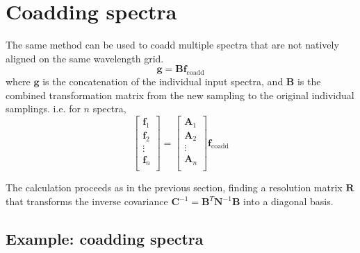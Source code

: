 \documentclass[12pt]{article}
\newcommand{\Ci}{\mathbf{C}^{-1}}
\newcommand{\R}{\mathbf{R}}
\newcommand{\A}{\mathbf{A}}
\newcommand{\N}{\mathbf{N}}
\newcommand{\f}{\mathbf{f}}
\begin{document}
\section{Coadding spectra}
\label{sec:coadd}

The same method can be used to coadd multiple spectra that are not natively
aligned on the same wavelength grid.
\begin{equation}
    \mathbf{g} = \mathbf{B} \f_\mathrm{coadd}
\end{equation}
where $\mathbf{g}$ is the concatenation of the individual input spectra,
and $\mathbf{B}$
is the combined transformation matrix from the new sampling to the original
individual samplings.  i.e. for $n$ spectra,
\begin{equation}
    \left[ \begin{array}{c}
        \f_1 \\
        \f_2 \\
        \vdots \\
        \f_n \\
    \end{array}
    \right] = \left[ \begin{array}{c}
        \A_1 \\
        \A_2 \\
        \vdots \\
        \A_n \\
    \end{array}
    \right] \f_\mathrm{coadd}
\end{equation}

The calculation proceeds as in the previous section, finding a resolution
matrix $\R$ that transforms the inverse covariance
$\Ci = \mathbf{B}^T \N^{-1} \mathbf{B}$ into a diagonal basis.

\subsection{Example: coadding spectra}
\end{document}
